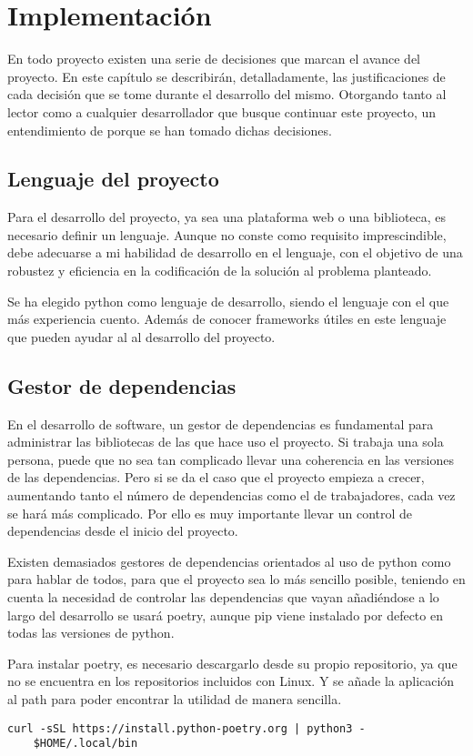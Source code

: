 \chapter{Implementación}
En todo proyecto existen una serie de decisiones que marcan el avance del proyecto. En este capítulo se describirán, detalladamente, las justificaciones de cada decisión que se tome durante el desarrollo del mismo. Otorgando tanto al lector como a cualquier desarrollador que busque continuar este proyecto, un entendimiento de porque se han tomado dichas decisiones.

\section{Lenguaje del proyecto}
Para el desarrollo del proyecto, ya sea una plataforma web o una biblioteca, es necesario definir un lenguaje. Aunque no conste como requisito imprescindible, debe adecuarse a mi habilidad de desarrollo en el lenguaje, con el objetivo de una robustez y eficiencia en la codificación de la solución al problema planteado. 

Se ha elegido \Gls{python} como lenguaje de desarrollo, siendo el lenguaje con el que más experiencia cuento. Además de conocer frameworks útiles en este lenguaje que pueden ayudar al al desarrollo del proyecto.

\section{Gestor de dependencias}
En el desarrollo de software, un gestor de \glspl{dependencia} es fundamental para administrar las bibliotecas de las que hace uso el proyecto. Si trabaja una sola persona, puede que no sea tan complicado llevar una coherencia en las versiones de las \glspl{dependencia}. Pero si se da el caso que el proyecto empieza a crecer, aumentando tanto el número de \glspl{dependencia} como el de trabajadores, cada vez se hará más complicado. Por ello es muy importante llevar un control de \glspl{dependencia} desde el inicio del proyecto.

Existen demasiados gestores de \glspl{dependencia} orientados al uso de \Gls{python} como para hablar de todos, para que el proyecto sea lo más sencillo posible, teniendo en cuenta la necesidad de controlar las \glspl{dependencia} que vayan añadiéndose a lo largo del desarrollo se usará \Gls{poetry}, aunque \Gls{pip} viene instalado por defecto en todas las versiones de \Gls{python}. 

Para instalar \gls{poetry}, es necesario descargarlo desde su propio repositorio, ya que no se encuentra en los repositorios incluidos con Linux. Y se añade la aplicación al \gls{path} para poder encontrar la utilidad de manera sencilla.
\begin{lstlisting}[style=consola]
	curl -sSL https://install.python-poetry.org | python3 -
	$HOME/.local/bin
\end{lstlisting}

